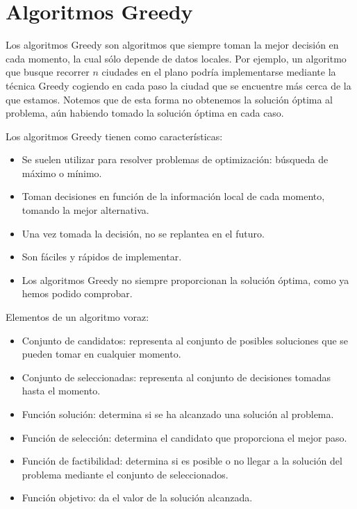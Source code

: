 \chapter{Algoritmos Greedy}
Los algoritmos Greedy son algoritmos que siempre toman la mejor decisión en cada momento, la cual sólo depende de datos locales. Por ejemplo, un algoritmo que busque recorrer $n$ ciudades en el plano podría implementarse mediante la técnica Greedy cogiendo en cada paso la ciudad que se encuentre más cerca de la que estamos. Notemos que de esta forma no obtenemos la solución óptima al problema, aún habiendo tomado la solución óptima en cada caso.

Los algoritmos Greedy tienen como características:
\begin{itemize}
    \item Se suelen utilizar para resolver problemas de optimización: búsqueda de máximo o mínimo.
    \item Toman decisiones en función de la información local de cada momento, tomando la mejor alternativa.
    \item Una vez tomada la decisión, no se replantea en el futuro.
    \item Son fáciles y rápidos de implementar.
    \item Los algoritmos Greedy no siempre proporcionan la solución óptima, como ya hemos podido comprobar.
\end{itemize}

Elementos de un algoritmo voraz:
\begin{itemize}
    \item Conjunto de candidatos: representa al conjunto de posibles soluciones que se pueden tomar en cualquier momento.
    \item Conjunto de seleccionadas: representa al conjunto de decisiones tomadas hasta el momento.
    \item Función solución: determina si se ha alcanzado una solución al problema.
    \item Función de selección: determina el candidato que proporciona el mejor paso.
    \item Función de factibilidad: determina si es posible o no llegar a la solución del problema mediante el conjunto de seleccionados.
    \item Función objetivo: da el valor de la solución alcanzada.
\end{itemize}

